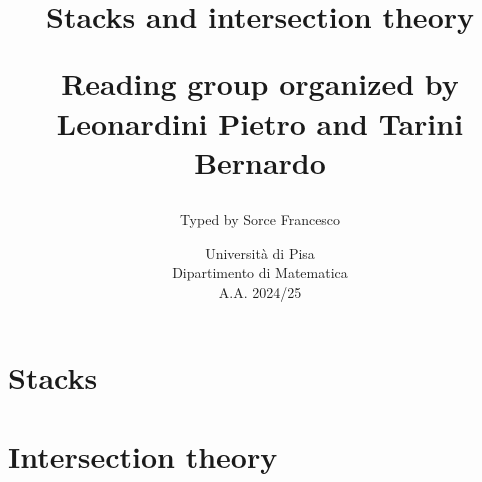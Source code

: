 \documentclass[a4paper]{report}
\title{{\Huge\bf Stacks and intersection theory}
\vspace{0.7cm}

\Large Reading group organized by\\ Leonardini Pietro and Tarini Bernardo\vfill}
\author{\Large Typed by Sorce Francesco}
\date{\vspace{1cm} Università di Pisa\\
Dipartimento di Matematica\\
A.A. 2024/25}
\begin{document}
\maketitle

\tableofcontents
\newpage

\part{Stacks}




\part{Intersection theory}



\appendix


\end{document}
